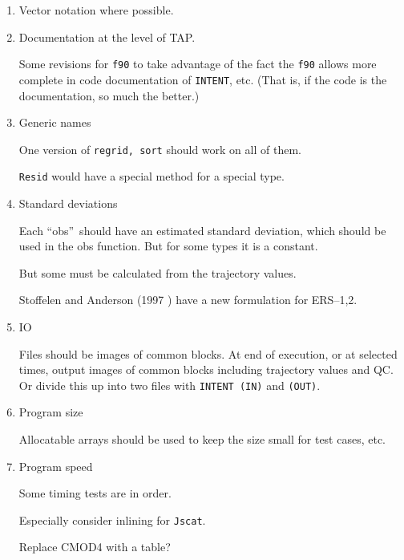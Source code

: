 \documentclass[11pt]{article}
\newcommand{\computer}[1]{{\tt #1}}
\newcommand{\ers}[1]{ERS--{#1}}
\newcommand{\obs}{``obs''}
\newcommand{\reference}[2]{(#1 \cite{#2})}
\begin{document}
\begin{enumerate}

\item Vector notation where possible.

\item Documentation at the level of TAP.

Some revisions for \computer{f90} to take advantage of the fact the
\computer{f90} allows more complete in code documentation of
\computer{INTENT}, etc.  (That is, if the code is the documentation,
so much the better.)

\item Generic names

One version of \computer{regrid, sort} should work on all of them.

\computer{Resid} would have a special method for a special type.

\item Standard deviations

Each \obs\ should have an estimated standard deviation, which should be
used in the obs function.  But for some types it is a constant.

But some must be calculated from the trajectory values.

Stoffelen and Anderson \reference{1997}{StoA97a} have a new formulation
for \ers1,2.

\item IO

Files should be images of common blocks.  At end of execution, or at
selected times, output images of common blocks including trajectory
values and QC.  Or divide this up into two files with \computer{INTENT
(IN)} and \computer{(OUT)}.

\item Program size

Allocatable arrays should be used to keep the size small for test
cases, etc.

\item Program speed

Some timing tests are in order.

Especially consider inlining for \computer{Jscat}.

Replace CMOD4 with a table?

\end{enumerate}

\end{document}
